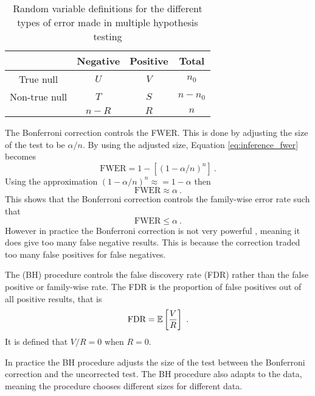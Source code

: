 \begin{table}
    \centering
    \begin{tabular}{c|c|c|c}
        &Negative&Positive&Total\\\hline
        True null & $U$ & $V$ & $n_0$\\
        Non-true null & $T$ & $S$ & $n-n_0$\\\hline
        &$n-R$&$R$&$n$
    \end{tabular}
    \caption{Random variable definitions for the different types of error made in multiple hypothesis testing}
    \label{table:inference_randomvariables}
\end{table}

The Bonferroni correction \citep{shaffer1995multiple, bland1995multiple, perneger1998what} controls the FWER. This is done by adjusting the size of the test to be $\alpha/n$. By using the adjusted size, Equation \eqref{eq:inference_fwer} becomes
\begin{equation}
    \text{FWER}=1-\left[(1-\alpha/n)^n\right]\ .
\end{equation}
Using the approximation $(1-\alpha/n)^n\approx = 1-\alpha$ then
\begin{equation}
    \text{FWER}\approx \alpha \ .
\end{equation}
This shows that the Bonferroni correction controls the family-wise error rate such that
\begin{equation}
    \text{FWER} \leqslant \alpha \ .
\end{equation}
However in practice the Bonferroni correction is not very powerful \citep{perneger1998what}, meaning it does give too many false negative results. This is because the correction traded too many false positives for false negatives.

The \cite{benjamini1995controlling} (BH) procedure controls the false discovery rate (FDR) \citep{benjamini2010discovering} rather than the false positive or family-wise rate. The FDR is the proportion of false positives out of all positive results, that is
\begin{equation}
    \text{FDR} = \operatorname{\mathbb{E}}\left[
        \dfrac{V}{R}
    \right]
    \ .
\end{equation}
It is defined that $V/R=0$ when $R=0$.

In practice the BH procedure adjusts the size of the test between the Bonferroni correction and the uncorrected test. The BH procedure also adapts to the data, meaning the procedure chooses different sizes for different data.

